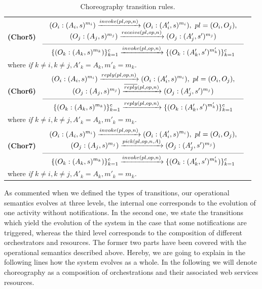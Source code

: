 \begin{table}[!ht]
{{\begin{tabular}{l}

\\[0.7cm]

\hspace{0.6cm}\textbf{(Chor5)}
$\reglaa{ %
(O_i:(A_i,s)^{m_i}) \xrightarrow{invoke(pl,op,n)} (O_i:(A'_i,s)^{m_i}),\ pl=(O_i,O_j),\\
(O_j:(A_j,s)^{m_j}) \xrightarrow{receive(pl,op,n)} (O_j:(A'_j,s')^{m_j})
}
{ %
\{(O_k:(A_k,s)^{m_k})\}_{k=1}^c
\xrightarrow{invoke(pl,op,n)}
\{(O_k:(A'_k,s')^{m'_k})\}_{k=1}^c
}{10}$
\\[0.7cm]
\hspace{2.cm}where  \it{if} $k\neq i,k\neq j, A'_k=A_k,m'_k=m_k$.

\\[0.2cm]

\hspace{0.6cm}\textbf{(Chor6)}
$\reglaa{ %
(O_i:(A_i,s)^{m_i}) \xrightarrow{reply(pl,op,n)} (O_i:(A'_i,s)^{m_i}),\ pl=(O_i,O_j),\\
(O_j:(A_j,s)^{m_j}) \xrightarrow{\overline{reply}(pl,op,n)} (O_j:(A'_j,s')^{m_j})
}
{ %
\{(O_k:(A_k,s)^{m_k})\}_{k=1}^c
\xrightarrow{reply(pl,op,n)}
\{(O_k:(A'_k,s')^{m'_k})\}_{k=1}^c
}{10}$\\[0.7cm]
\hspace{2.cm}where  \it{if} $k\neq i,k\neq j, A'_k=A_k,m'_k=m_k$.

\\[0.2cm]

\hspace{0.6cm}\textbf{(Chor7)}
$\reglaa{ %
(O_i:(A_i,s)^{m_i}) \xrightarrow{invoke(pl,op,n)} (O_i:(A'_i,s)^{m_i}),\ pl=(O_i,O_j),\\
(O_j:(A_j,s)^{m_j}) \xrightarrow{pick(pl,op,n,A)} (O_j:(A'_j,s')^{m_j})
}
{ %
\{(O_k:(A_k,s)^{m_k})\}_{k=1}^c
\xrightarrow{invoke(pl,op,n)}
\{(O_k:(A'_k,s')^{m'_k})\}_{k=1}^c
}{10}$\\[0.7cm]
\hspace{2.cm}where  \it{if} $k\neq i,k\neq j, A'_k=A_k,m'_k=m_k$.
\\[0.4cm]
\end{tabular}
}}
\caption{\label{tab:coreo}Choreography transition rules.}
\end{table}
As commented when we defined the types of transitions, our operational semantics evolves at three levels, the internal one corresponds to the evolution of one activity without notifications. In the second one, we state the transitions which yield the evolution of the system in the case that some notifications are triggered, whereas the third level corresponds to the composition of different orchestrators and resources. The former two parts have been covered with the operational semantics described above. Hereby, we are going to explain in the following lines how the system evolves as a whole. In the following we will denote choreography as a composition of orchestrations and their associated web services resources.
